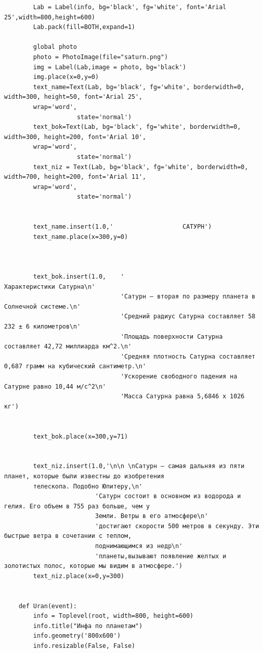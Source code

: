 \documentclass[11pt,a4paper]{report}
\begin{document}
\begin{verbatim}
        Lab = Label(info, bg='black', fg='white', font='Arial 25',width=800,height=600)  
        Lab.pack(fill=BOTH,expand=1)
        
        global photo
        photo = PhotoImage(file="saturn.png")
        img = Label(Lab,image = photo, bg='black')
        img.place(x=0,y=0)
        text_name=Text(Lab, bg='black', fg='white', borderwidth=0, width=300, height=50, font='Arial 25', 
        wrap='word',
                    state='normal')  
        text_bok=Text(Lab, bg='black', fg='white', borderwidth=0, width=300, height=200, font='Arial 10', 
        wrap='word',
                    state='normal')  
        text_niz = Text(Lab, bg='black', fg='white', borderwidth=0, width=700, height=200, font='Arial 11', 
        wrap='word',
                    state='normal')  
    
       
        text_name.insert(1.0,'                   САТУРН')
        text_name.place(x=300,y=0)
        
        
        
        text_bok.insert(1.0,    '                                           Характеристики Сатурна\n' 
                                'Сатурн – вторая по размеру планета в Солнечной системе.\n'
                                'Средний радиус Сатурна составляет 58 232 ± 6 километров\n'
                                'Площадь поверхности Сатурна составляет 42,72 миллиарда км^2.\n'
                                'Средняя плотность Сатурна составляет 0,687 грамм на кубический сантиметр.\n'
                                'Ускорение свободного падения на Сатурне равно 10,44 м/c^2\n'
                                'Масса Сатурна равна 5,6846 х 1026 кг')
        
        
        text_bok.place(x=300,y=71)        
        
        
        text_niz.insert(1.0,'\n\n \nСатурн — самая дальняя из пяти планет, которые были известны до изобретения 
        телескопа. Подобно Юпитеру,\n'
                         'Сатурн состоит в основном из водорода и гелия. Его объем в 755 раз больше, чем у 
                         Земли. Ветры в его атмосфере\n'
                         'достигают скорости 500 метров в секунду. Эти быстрые ветра в сочетании с теплом, 
                         поднимающимся из недр\n' 
                         'планеты,вызывают появление желтых и золотистых полос, которые мы видим в атмосфере.')
        text_niz.place(x=0,y=300)
        
        
    def Uran(event):  
        info = Toplevel(root, width=800, height=600)
        info.title("Инфа по планетам")
        info.geometry('800x600')
        info.resizable(False, False)
        

\end{verbatim}
\end{document}

